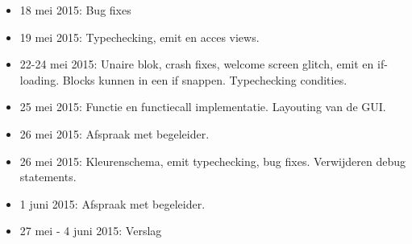 \documentclass[]{article}
\begin{document}
\begin{itemize}
\item 18 mei 2015: Bug fixes
\item 19 mei 2015: Typechecking, emit en acces views.
\item 22-24 mei 2015: Unaire blok, crash fixes, welcome screen glitch, emit en if-loading. Blocks kunnen in een if snappen. Typechecking condities.
\item 25 mei 2015: Functie en functiecall implementatie. Layouting van de GUI.
\item 26 mei 2015: Afspraak met begeleider.
\item 26 mei 2015: Kleurenschema, emit typechecking, bug fixes. Verwijderen debug statements.
\item 1 juni 2015: Afspraak met begeleider.
\item 27 mei - 4 juni 2015: Verslag

\end{itemize} 
\end{document}
